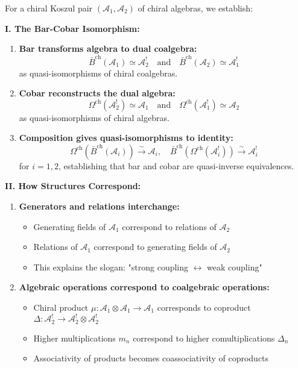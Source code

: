 \begin{theorem}
For a chiral Koszul pair $(\mathcal{A}_1, \mathcal{A}_2)$ of chiral algebras, we establish:

\medskip
\noindent\textbf{I. The Bar-Cobar Isomorphism:}
\begin{enumerate}
\item \textbf{Bar transforms algebra to dual coalgebra:}
   $$\bar{B}^{\text{ch}}(\mathcal{A}_1) \simeq \mathcal{A}_2^! \quad \text{and} \quad \bar{B}^{\text{ch}}(\mathcal{A}_2) \simeq \mathcal{A}_1^!$$
   as quasi-isomorphisms of chiral coalgebras.

\item \textbf{Cobar reconstructs the dual algebra:}
   $$\Omega^{\text{ch}}(\mathcal{A}_2^!) \simeq \mathcal{A}_1 \quad \text{and} \quad \Omega^{\text{ch}}(\mathcal{A}_1^!) \simeq \mathcal{A}_2$$
   as quasi-isomorphisms of chiral algebras.

\item \textbf{Composition gives quasi-isomorphisms to identity:}
   $$\Omega^{\text{ch}}(\bar{B}^{\text{ch}}(\mathcal{A}_i)) \xrightarrow{\sim} \mathcal{A}_i, \quad \bar{B}^{\text{ch}}(\Omega^{\text{ch}}(\mathcal{A}_i^!)) \xrightarrow{\sim} \mathcal{A}_i^!$$
   for $i = 1, 2$, establishing that bar and cobar are quasi-inverse equivalences.
\end{enumerate}

\medskip
\noindent\textbf{II. How Structures Correspond:}
\begin{enumerate}
\item \textbf{Generators and relations interchange:}
   \begin{itemize}
   \item Generating fields of $\mathcal{A}_1$ correspond to relations of $\mathcal{A}_2$
   \item Relations of $\mathcal{A}_1$ correspond to generating fields of $\mathcal{A}_2$
   \item This explains the slogan: "strong coupling $\leftrightarrow$ weak coupling"
   \end{itemize}

\item \textbf{Algebraic operations correspond to coalgebraic operations:}
   \begin{itemize}
   \item Chiral product $\mu: \mathcal{A}_1 \otimes \mathcal{A}_1 \to \mathcal{A}_1$ corresponds to coproduct $\Delta: \mathcal{A}_2^! \to \mathcal{A}_2^! \otimes \mathcal{A}_2^!$
   \item Higher multiplications $m_n$ correspond to higher comultiplications $\Delta_n$
   \item Associativity of products becomes coassociativity of coproducts
   \end{itemize}


\end{enumerate}
\end{theorem}
